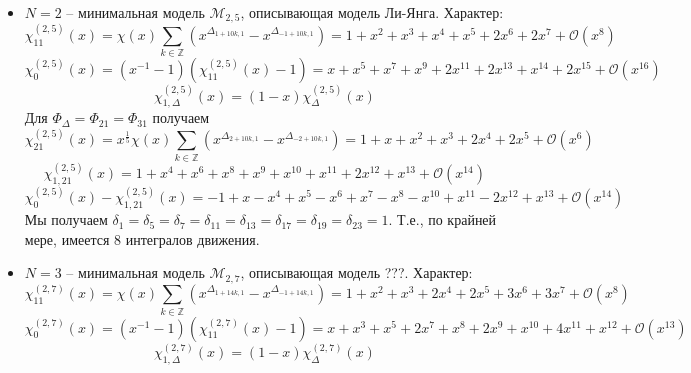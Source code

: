 \documentclass[12pt]{article}
\theoremstyle{definition}
\begin{document}
\begin{itemize}
    \item $N=2$ -- минимальная модель $\mathcal{M}_{2,5}$, описывающая модель Ли-Янга. Характер:
    \begin{equation}
        \chi^{(2,5)}_{11}(x)=\chi(x)\sum\limits_{k\in\mathbb{Z}}(x^{\Delta_{1+10k,1}}-x^{\Delta_{-1+10k,1}})=1+x^2+x^3+x^4+x^5+2x^6+2x^7+\mathcal{O}(x^8)
    \end{equation}
    \begin{equation}
        \chi^{(2,5)}_0(x)=(x^{-1}-1)(\chi^{(2,5)}_{11}(x)-1)=x+x^5+x^7+x^9+2x^{11}+2x^{13}+x^{14}+2x^{15}+\mathcal{O}(x^{16})
    \end{equation}
    \begin{equation}
        \chi^{(2,5)}_{1,\Delta}(x)=(1-x)\chi^{(2,5)}_\Delta(x)
    \end{equation}
    Для $\Phi_\Delta =\Phi_{21}=\Phi_{31}$ получаем
    \begin{equation}
        \chi^{(2,5)}_{21}(x)=x^{\frac{1}{5}}\chi(x)\sum\limits_{k\in\mathbb{Z}}(x^{\Delta_{2+10k,1}}-x^{\Delta_{-2+10k,1}})=1+x+x^2+x^3+2x^4+2x^5+\mathcal{O}(x^6)
    \end{equation}
    \begin{equation}
        \chi^{(2,5)}_{1,21}(x)=1+x^4+x^6+x^8+x^9+x^{10}+x^{11}+2x^{12}+x^{13}+\mathcal{O}(x^{14})
    \end{equation}
    \begin{equation}
        \chi^{(2,5)}_0(x)-\chi^{(2,5)}_{1,21}(x)=-1+x-x^4+x^5-x^6+x^7-x^8-x^{10}+x^{11}-2x^{12}+x^{13}+\mathcal{O}(x^{14})
    \end{equation}
    Мы получаем $\delta_1=\delta_5=\delta_7=\delta_{11}=\delta_{13}=\delta_{17}=\delta_{19}=\delta_{23}=1$. Т.е., по крайней мере, имеется 8 интегралов движения.
    \item $N=3$ -- минимальная модель $\mathcal{M}_{2,7}$, описывающая модель ???. Характер:
    \begin{equation}
        \chi^{(2,7)}_{11}(x)=\chi(x)\sum\limits_{k\in\mathbb{Z}}(x^{\Delta_{1+14k,1}}-x^{\Delta_{-1+14k,1}})=1+x^2+x^3+2x^4+2x^5+3x^6+3x^7+\mathcal{O}(x^8)
    \end{equation}
    \begin{equation}
        \chi^{(2,7)}_0(x)=(x^{-1}-1)(\chi^{(2,7)}_{11}(x)-1)=x+x^3+x^5+2x^7+x^8+2x^9+x^{10}+4x^{11}+x^{12}+\mathcal{O}(x^{13})
    \end{equation}
    \begin{equation}
        \chi^{(2,7)}_{1,\Delta}(x)=(1-x)\chi^{(2,7)}_\Delta(x)

\end{equation}
\end{itemize}
\end{document}
